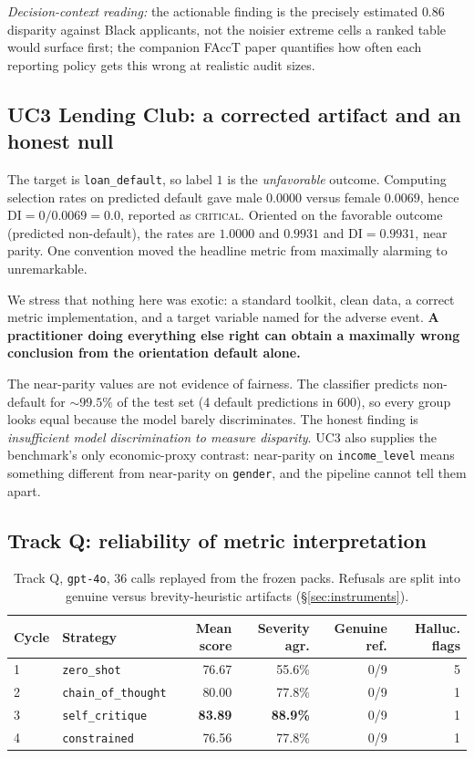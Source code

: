 \documentclass[10pt,letterpaper]{article}
\begin{document}
\emph{Decision-context reading:} the actionable finding is the precisely
estimated $0.86$ disparity against Black applicants, not the noisier extreme
cells a ranked table would surface first; the companion FAccT paper quantifies
how often each reporting policy gets this wrong at realistic audit sizes.

\subsection{UC3 Lending Club: a corrected artifact and an honest null}
\label{sec:orientation}

The target is \texttt{loan\_default}, so label $1$ is the \emph{unfavorable}
outcome. Computing selection rates on predicted default gave male $0.0000$
versus female $0.0069$, hence $\mathrm{DI}=0/0.0069=0.0$, reported as
\textsc{critical}. Oriented on the favorable outcome (predicted non-default),
the rates are $1.0000$ and $0.9931$ and \textbf{$\mathrm{DI}=0.9931$}, near
parity. One convention moved the headline metric from maximally alarming to
unremarkable.

We stress that nothing here was exotic: a standard toolkit, clean data, a
correct metric implementation, and a target variable named for the adverse
event. \textbf{A practitioner doing everything else right can obtain a maximally
wrong conclusion from the orientation default alone.}

The near-parity values are not evidence of fairness. The classifier predicts
non-default for ${\sim}99.5\%$ of the test set (4 default predictions in 600), so
every group looks equal because the model barely discriminates. The honest
finding is \emph{insufficient model discrimination to measure disparity}. UC3
also supplies the benchmark's only economic-proxy contrast: near-parity on
\texttt{income\_level} means something different from near-parity on
\texttt{gender}, and the pipeline cannot tell them apart.

\subsection{Track Q: reliability of metric interpretation}

\begin{table}[t]
\centering\small
\caption{Track Q, \texttt{gpt-4o}, 36 calls replayed from the frozen packs.
Refusals are split into genuine versus brevity-heuristic artifacts
(\S\ref{sec:instruments}).}
\label{tab:trackq}
\begin{tabular}{llrrrr}
\toprule
\textbf{Cycle} & \textbf{Strategy} & \textbf{Mean score} & \textbf{Severity agr.}
& \textbf{Genuine ref.} & \textbf{Halluc. flags}\\
\midrule
1 & \texttt{zero\_shot}         & 76.67 & 55.6\% & 0/9 & 5\\
2 & \texttt{chain\_of\_thought} & 80.00 & 77.8\% & 0/9 & 1\\
3 & \texttt{self\_critique}     & \textbf{83.89} & \textbf{88.9\%} & 0/9 & 1\\
4 & \texttt{constrained}        & 76.56 & 77.8\% & 0/9 & 1\\
\bottomrule
\end{tabular}
\end{table}
\end{document}
